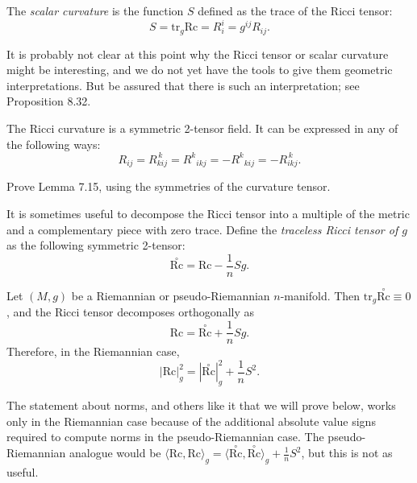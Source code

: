 The \emph{scalar curvature} is the function $S$ defined as the trace of the Ricci tensor:
\[
S = \text{tr}_g \text{Rc} = R_i^i = g^{ij} R_{ij}.
\]

It is probably not clear at this point why the Ricci tensor or scalar curvature might be interesting, and we do not yet have the tools to give them geometric interpretations. But be assured that there is such an interpretation; see Proposition 8.32.

\begin{lemma}
\label{lem:ricci-symmetries}
The Ricci curvature is a symmetric 2-tensor field. It can be expressed in any of the following ways:
\[
R_{ij} = R_{kij}^{\,k} = R^{k}{}_{ikj} = -R^{k}{}_{kij} = -R_{ikj}^{\,k}.
\]
\end{lemma}

\begin{exercise}
\label{exer:ricci-symmetries-proof}
Prove Lemma 7.15, using the symmetries of the curvature tensor.
\end{exercise}

It is sometimes useful to decompose the Ricci tensor into a multiple of the metric and a complementary piece with zero trace. Define the \emph{traceless Ricci tensor of $g$} as the following symmetric 2-tensor:
\[
\stackrel{\circ}{\text{Rc}} = \text{Rc} - \frac{1}{n}Sg.
\]

\begin{proposition}
\label{prop:ricci-tensor-decomposition}
Let $(M, g)$ be a Riemannian or pseudo-Riemannian $n$-manifold. Then $\mathrm{tr}_g \stackrel{\circ}{\text{Rc}} \equiv 0$, and the Ricci tensor decomposes orthogonally as
\begin{equation}
\text{Rc} = \stackrel{\circ}{\text{Rc}} + \frac{1}{n}Sg. \tag{7.27}
\end{equation}
Therefore, in the Riemannian case,
\begin{equation}
|\text{Rc}|_g^2 = |\stackrel{\circ}{\text{Rc}}|_g^2 + \frac{1}{n}S^2. \tag{7.28}
\end{equation}
\end{proposition}

\begin{remark}
The statement about norms, and others like it that we will prove below, works only in the Riemannian case because of the additional absolute value signs required to compute norms in the pseudo-Riemannian case. The pseudo-Riemannian analogue would be $\langle \text{Rc}, \text{Rc} \rangle_g = \langle \stackrel{\circ}{\text{Rc}}, \stackrel{\circ}{\text{Rc}} \rangle_g + \frac{1}{n}S^2$, but this is not as useful.
\end{remark}

